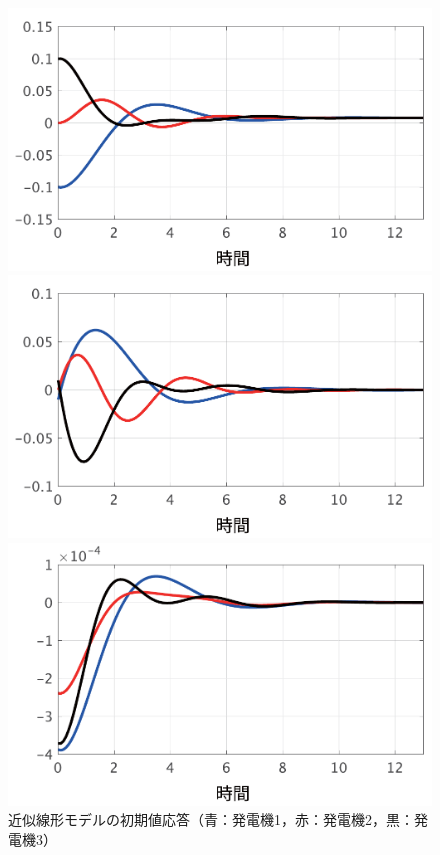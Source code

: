 \documentclass[tombow,dvipdfmx]{corona-a5-1.1}
\begin{document}
\begin{figure}[t]
  \centering
  {
  \begin{minipage}{0.32\linewidth}
    \centering
    \includegraphics[width = .99\linewidth]{figs/delta}
  \end{minipage}
  \begin{minipage}{0.32\linewidth}
    \centering
    \includegraphics[width = .99\linewidth]{figs/omega}
  \end{minipage}
  \begin{minipage}{0.32\linewidth}
    \centering
    \includegraphics[width = .99\linewidth]{figs/E}
  \end{minipage}
  }
  \caption{近似線形モデルの初期値応答（青：発電機1，赤：発電機2，黒：発電機3）}
  \label{fig:timeex}
\end{figure}
\end{document}
